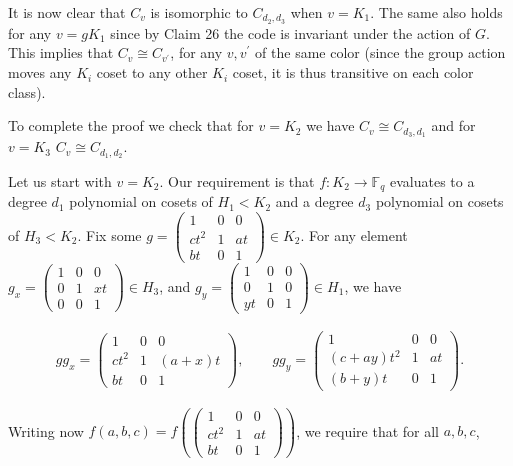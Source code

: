 It is now clear that $C_{v}$ is isomorphic to $C_{d_{2},d_{3}}$ when $v=K_{1}$.
The same also holds for any $v=gK_{1}$ since by Claim 26 the code is invariant under the action of $G$. This implies that $C_{v}\cong C_{v^{\prime}}$, for any $v,v^{\prime}$ of the same color (since the group action moves any $K_{i}$ coset to any other $K_{i}$ coset, it is thus transitive on each color class).\par




To complete the proof we check that for $v=K_{2}$ we have $C_{v}\cong C_{d_{3},d_{1}}$ and for $v=K_{3}$ $C_{v}\cong C_{d_{1},d_{2}}$.\par




Let us start with $v=K_{2}$. Our requirement is that $f:K_{2}\to\mathbb{F}_{q}$ evaluates to a degree $d_{1}$ polynomial on cosets of $H_{1}<K_{2}$ and a degree $d_{3}$ polynomial on cosets of $H_{3}<K_{2}$.
Fix some $g=\begin{pmatrix}1&0&0\\
ct^{2}&1&at\\
bt&0&1\end{pmatrix}\in K_{2}$. For any element $g_{x}=\begin{pmatrix}1&0&0\\
0&1&xt\\
0&0&1\end{pmatrix}\in H_{3}$, and $g_{y}=\begin{pmatrix}1&0&0\\
0&1&0\\
yt&0&1\end{pmatrix}\in H_{1}$, we have\par


\[\begin{gathered}
gg_{x}=\begin{pmatrix}1&0&0\\
ct^{2}&1&(a+x)t\\
bt&0&1\end{pmatrix},\qquad gg_{y}=\begin{pmatrix}1&0&0\\
(c+ay)t^{2}&1&at\\
(b+y)t&0&1\end{pmatrix}.
\end{gathered}\]


Writing now $f(a,b,c)=f\left(\begin{pmatrix}1&0&0\\
ct^{2}&1&at\\
bt&0&1\end{pmatrix}\right)$, we require that for all $a,b,c$,\par



